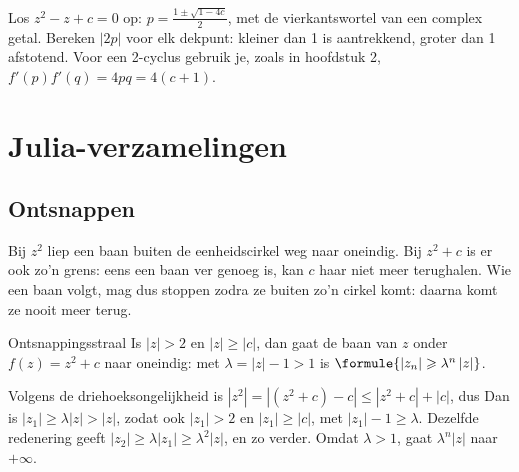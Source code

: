\begin{werkwijze}
Los $z^2 - z + c = 0$ op: $p = \tfrac{1 \pm \sqrt{1 - 4c}}{2}$, met de vierkantswortel van een complex getal. Bereken $|2p|$ voor elk dekpunt: kleiner dan 1 is aantrekkend, groter dan 1 afstotend. Voor een 2-cyclus gebruik je, zoals in hoofdstuk 2, $f'(p)f'(q) = 4pq = 4(c + 1)$.
\end{werkwijze}


\begin{oefeningen}

\end{oefeningen}

\section{Julia-verzamelingen}

\subsection{Ontsnappen}

Bij $z^2$ liep een baan buiten de eenheidscirkel weg naar oneindig. Bij $z^2 + c$ is er ook zo'n grens: eens een baan ver genoeg is, kan $c$ haar niet meer terughalen. Wie een baan volgt, mag dus stoppen zodra ze buiten zo'n cirkel komt: daarna komt ze nooit meer terug.

\begin{theorie}
\begin{stelling}{Ontsnappingsstraal}
Is $|z| > 2$ en $|z| \geqslant |c|$, dan gaat de baan van $z$ onder $f(z) = z^2 + c$ naar oneindig: met $\lambda = |z| - 1 > 1$ is $\formule{|z_n| \geqslant \lambda^n\,|z|}$.
\end{stelling}

\begin{bewijs}
Volgens de driehoeksongelijkheid is $|z^2| = |(z^2 + c) - c| \leqslant |z^2 + c| + |c|$, dus
Dan is $|z_1| \geqslant \lambda|z| > |z|$, zodat ook $|z_1| > 2$ en $|z_1| \geqslant |c|$, met $|z_1| - 1 \geqslant \lambda$. Dezelfde redenering geeft $|z_2| \geqslant \lambda|z_1| \geqslant \lambda^2|z|$, en zo verder. Omdat $\lambda > 1$, gaat $\lambda^n|z|$ naar $+\infty$.
\end{bewijs}
\end{theorie}

